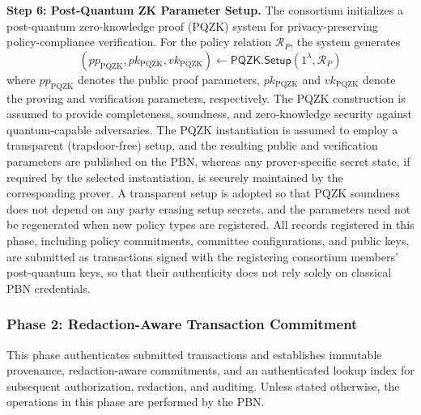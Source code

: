 \documentclass[lettersize,journal]{IEEEtran}
\begin{document}
    \textbf{Step 6: Post-Quantum ZK Parameter Setup.}
    The consortium initializes a post-quantum zero-knowledge proof
    (PQZK) system for privacy-preserving policy-compliance verification.
    For the policy relation $\mathcal{R}_{P}$, the system generates
    \begin{equation}
    (pp_{\mathrm{PQZK}},pk_{\mathrm{PQZK}},vk_{\mathrm{PQZK}})
    \leftarrow
    \mathsf{PQZK.Setup}(1^\lambda,\mathcal{R}_{P})
    \end{equation}
    where $pp_{\mathrm{PQZK}}$ denotes the public proof parameters,
    $pk_{\mathrm{PQZK}}$ and $vk_{\mathrm{PQZK}}$ denote the proving and
    verification parameters, respectively. The PQZK construction is
    assumed to provide completeness, soundness, and zero-knowledge security
    against quantum-capable adversaries.
     {The PQZK instantiation is assumed to employ a transparent
    (trapdoor-free) setup, and the resulting public and verification
    parameters are published on the PBN,}
    whereas any prover-specific secret state, if required by the selected
    instantiation, is securely maintained by the corresponding prover.
     {A transparent setup is adopted so that PQZK soundness does
    not depend on any party erasing setup secrets, and the parameters need not
    be regenerated when new policy types are registered.}
     {All records registered in this phase, including policy
    commitments, committee configurations, and public keys, are submitted as
    transactions signed with the registering consortium members'
    post-quantum keys, so that their authenticity does not rely solely on
    classical PBN credentials.}
    
    
    
    
    \subsubsection*{\textbf{Phase 2: Redaction-Aware
    Transaction Commitment}}
    
    This phase authenticates submitted transactions and
    establishes immutable provenance, redaction-aware
    commitments, and an authenticated lookup index for
    subsequent authorization, redaction, and auditing.
     {Unless stated otherwise, the operations in this phase
    are performed by the PBN.}
    
\end{document}
